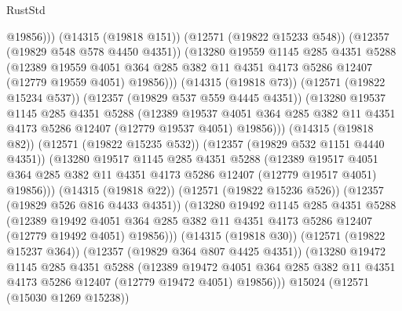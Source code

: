 \begin{lexlean}{RustStd}
\begin{coremodule}
                    @19856)))
              (@14315 (@19818 @151))
              (@12571 (@19822 @15233 @548))
              (@12357 (@19829 @548 @578 @4450 @4351))
              (@13280
                @19559
                @1145
                @285
                @4351
                @5288
                (@12389
                  @19559
                  @4051
                  @364
                  @285
                  @382
                  @11
                  @4351
                  @4173
                  @5286
                  @12407
                  (@12779 @19559 @4051)
                  @19856)))
            (@14315 (@19818 @73))
            (@12571 (@19822 @15234 @537))
            (@12357 (@19829 @537 @559 @4445 @4351))
            (@13280
              @19537
              @1145
              @285
              @4351
              @5288
              (@12389
                @19537
                @4051
                @364
                @285
                @382
                @11
                @4351
                @4173
                @5286
                @12407
                (@12779 @19537 @4051)
                @19856)))
          (@14315 (@19818 @82))
          (@12571 (@19822 @15235 @532))
          (@12357 (@19829 @532 @1151 @4440 @4351))
          (@13280
            @19517
            @1145
            @285
            @4351
            @5288
            (@12389
              @19517
              @4051
              @364
              @285
              @382
              @11
              @4351
              @4173
              @5286
              @12407
              (@12779 @19517 @4051)
              @19856)))
        (@14315 (@19818 @22))
        (@12571 (@19822 @15236 @526))
        (@12357 (@19829 @526 @816 @4433 @4351))
        (@13280
          @19492
          @1145
          @285
          @4351
          @5288
          (@12389
            @19492
            @4051
            @364
            @285
            @382
            @11
            @4351
            @4173
            @5286
            @12407
            (@12779 @19492 @4051)
            @19856)))
      (@14315 (@19818 @30))
      (@12571 (@19822 @15237 @364))
      (@12357 (@19829 @364 @807 @4425 @4351))
      (@13280
        @19472
        @1145
        @285
        @4351
        @5288
        (@12389
          @19472
          @4051
          @364
          @285
          @382
          @11
          @4351
          @4173
          @5286
          @12407
          (@12779 @19472 @4051)
          @19856)))
    @15024
    (@12571 (@15030 @1269 @15238))

\end{coremodule}
\end{lexlean}
